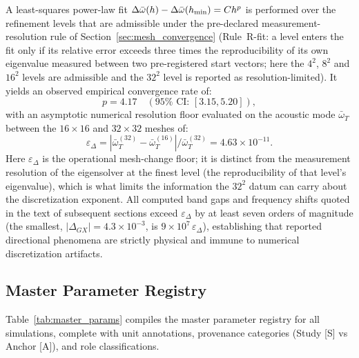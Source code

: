 A least-squares power-law fit $\Delta\bar{\omega}(h) - \Delta\bar{\omega}(h_{\min}) = C h^p$ is performed over the refinement levels that are admissible under the pre-declared measurement-resolution rule of Section~\ref{sec:mesh_convergence} (Rule~R-fit: a level enters the fit only if its relative error exceeds three times the reproducibility of its own eigenvalue measured between two pre-registered start vectors; here the $4^2$, $8^2$ and $16^2$ levels are admissible and the $32^2$ level is reported as resolution-limited). It yields an observed empirical convergence rate of:
\begin{equation}
p = 4.17 \quad (95\% \text{ CI: } [3.15, 5.20]),
\label{eq:empirical_rate}
\end{equation}
with an asymptotic numerical resolution floor evaluated on the acoustic mode $\bar{\omega}_T$ between the $16 \times 16$ and $32 \times 32$ meshes of:
\begin{equation}
\varepsilon_\Delta = \left| \bar{\omega}_T^{(32)} - \bar{\omega}_T^{(16)} \right| \big/ \bar{\omega}_T^{(32)} = 4.63 \times 10^{-11}.
\label{eq:resolution_floor}
\end{equation}
Here $\varepsilon_\Delta$ is the operational mesh-change floor; it is distinct from the measurement resolution of the eigensolver at the finest level (the reproducibility of that level's eigenvalue), which is what limits the information the $32^2$ datum can carry about the discretization exponent. All computed band gaps and frequency shifts quoted in the text of subsequent sections exceed $\varepsilon_\Delta$ by at least seven orders of magnitude (the smallest, $|\Delta_{GX}| = 4.3\times10^{-3}$, is $9\times10^{7}\,\varepsilon_\Delta$), establishing that reported directional phenomena are strictly physical and immune to numerical discretization artifacts.

\subsection{Master Parameter Registry}
Table~\ref{tab:master_params} compiles the master parameter registry for all simulations, complete with unit annotations, provenance categories (Study [S] vs Anchor [A]), and role classifications.

\begin{table}[htbp]
\centering
\caption{Master simulation parameter registry with provenance classifications.}
\label{tab:master_params}

\end{table}
